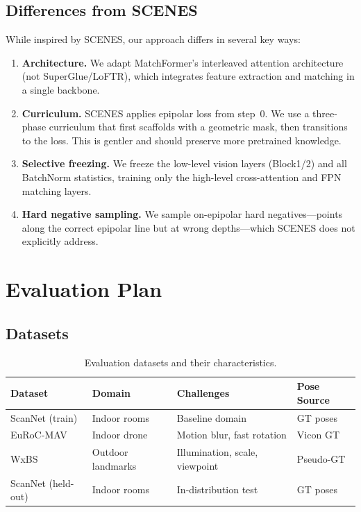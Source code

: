 \documentclass[11pt,a4paper]{article}
\begin{document}
\subsection{Differences from SCENES}

While inspired by SCENES, our approach differs in several key ways:

\begin{enumerate}[leftmargin=*]
    \item \textbf{Architecture.} We adapt MatchFormer's interleaved attention architecture (not SuperGlue/LoFTR), which integrates feature extraction and matching in a single backbone.
    \item \textbf{Curriculum.} SCENES applies epipolar loss from step~0. We use a three-phase curriculum that first scaffolds with a geometric mask, then transitions to the loss. This is gentler and should preserve more pretrained knowledge.
    \item \textbf{Selective freezing.} We freeze the low-level vision layers (Block1/2) and all BatchNorm statistics, training only the high-level cross-attention and FPN matching layers.
    \item \textbf{Hard negative sampling.} We sample on-epipolar hard negatives---points along the correct epipolar line but at wrong depths---which SCENES does not explicitly address.
\end{enumerate}

\section{Evaluation Plan}

\subsection{Datasets}

\begin{table}[h]
\centering
\caption{Evaluation datasets and their characteristics.}
\begin{tabular}{llll}
\toprule
\textbf{Dataset} & \textbf{Domain} & \textbf{Challenges} & \textbf{Pose Source} \\
\midrule
ScanNet (train) & Indoor rooms & Baseline domain & GT poses \\
EuRoC-MAV & Indoor drone & Motion blur, fast rotation & Vicon GT \\
WxBS & Outdoor landmarks & Illumination, scale, viewpoint & Pseudo-GT \\
ScanNet (held-out) & Indoor rooms & In-distribution test & GT poses \\
\bottomrule
\end{tabular}
\end{table}
\end{document}
